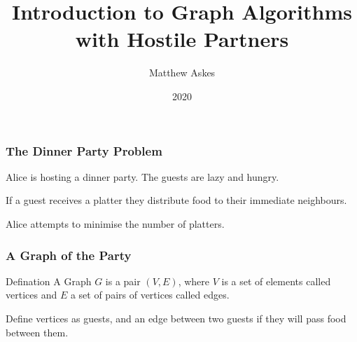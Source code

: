 \documentclass{beamer}
\title{Introduction to Graph Algorithms with Hostile Partners}
\author{Matthew Askes}
\institute{Victoria University of Wellington}
\date{2020}
\begin{document}
\frame{\titlepage}

\begin{frame}
    \frametitle{The Dinner Party Problem}
    Alice is hosting a dinner party. The guests are lazy and hungry.     
    
    \bigskip
    \pause
    
    If a guest receives a platter they distribute food to their immediate neighbours.
    
    \bigskip
    \pause
    
    Alice attempts to minimise the number of platters.
    
\end{frame}

\begin{frame}%
    \frametitle{A Graph of the Party}
    
    \begin{block}{Defination}        
        A Graph $G$ is a pair $(V,E)$, where $V$ is a set of elements called vertices and $E$ a set of pairs of vertices called edges. 
    \end{block}
    
    Define vertices as guests, and an edge between two guests if they will pass food between them.
    
\end{frame}
\end{document}
